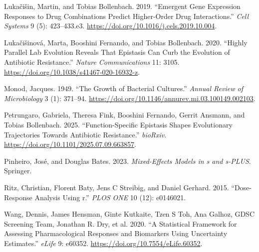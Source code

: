 \documentclass[
]{article}
\newlength{\cslhangindent}
\newenvironment{CSLReferences}[2] %
 {\begin{list}{}{%
  \setlength{\itemindent}{0pt}
  \setlength{\leftmargin}{0pt}
  \setlength{\parsep}{0pt}
  \ifodd #1
   \setlength{\leftmargin}{\cslhangindent}
   \setlength{\itemindent}{-1\cslhangindent}
  \fi
  \setlength{\itemsep}{#2\baselineskip}}}
 {\end{list}}
\begin{document}
\begin{CSLReferences}{1}{0}
Lukačišin, Martin, and Tobias Bollenbach. 2019. {``Emergent Gene
Expression Responses to Drug Combinations Predict Higher-Order Drug
Interactions.''} \emph{Cell Systems} 9 (5): 423--433.e3.
\url{https://doi.org/10.1016/j.cels.2019.10.004}.

Lukačišinová, Marta, Booshini Fernando, and Tobias Bollenbach. 2020.
{``Highly Parallel Lab Evolution Reveals That Epistasis Can Curb the
Evolution of Antibiotic Resistance.''} \emph{Nature Communications} 11:
3105. \url{https://doi.org/10.1038/s41467-020-16932-z}.

Monod, Jacques. 1949. {``The Growth of Bacterial Cultures.''}
\emph{Annual Review of Microbiology} 3 (1): 371--94.
\url{https://doi.org/10.1146/annurev.mi.03.100149.002103}.

Petrungaro, Gabriela, Theresa Fink, Booshini Fernando, Gerrit Ansmann,
and Tobias Bollenbach. 2025. {``Function-Specific Epistasis Shapes
Evolutionary Trajectories Towards Antibiotic Resistance.''}
\emph{bioRxiv}. \url{https://doi.org/10.1101/2025.07.09.663857}.

Pinheiro, José, and Douglas Bates. 2023. \emph{Mixed-Effects Models in s
and s-PLUS}. Springer.

Ritz, Christian, Florent Baty, Jens C Streibig, and Daniel Gerhard.
2015. {``Dose-Response Analysis Using r.''} \emph{PLOS ONE} 10 (12):
e0146021.

Wang, Dennis, James Hensman, Ginte Kutkaite, Tzen S Toh, Ana Galhoz,
GDSC Screening Team, Jonathan R. Dry, et al. 2020. {``A Statistical
Framework for Assessing Pharmacological Responses and Biomarkers Using
Uncertainty Estimates.''} \emph{eLife} 9: e60352.
\url{https://doi.org/10.7554/eLife.60352}.

\end{CSLReferences}
\end{document}
